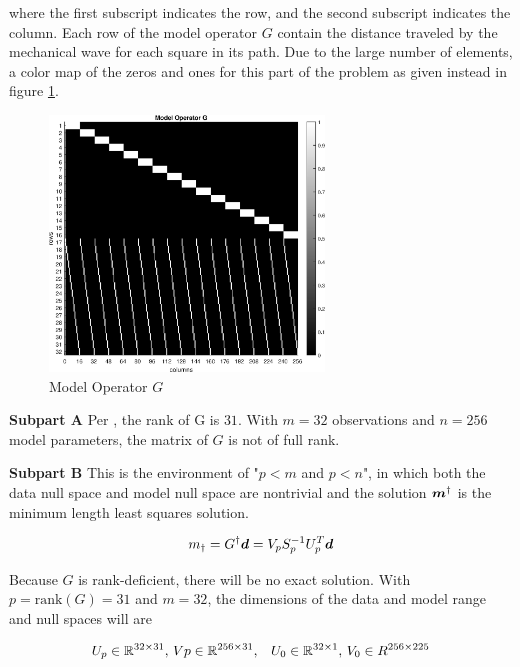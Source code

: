 where the first subscript indicates the row, and the second subscript indicates the column. Each row of the model operator $G$ contain the distance traveled by the mechanical wave for each square in its path. Due to the large number of elements, a color map of the zeros and ones for this part of the problem as given instead in figure \ref{fig: prob2 part A model operator G}.

\begin{figure}[h] 
	\centering
	\includegraphics[width=0.65\textwidth]{./images/prob2_partA_model_operator_G.eps}
	\caption{Model Operator $G$}
	\label{fig: prob2 part A model operator G}
\end{figure}
\FloatBarrier

\textbf{Subpart A} \newline
Per \MATLAB, the rank of G is $31$. With $m = 32$ observations and $n = 256$ model parameters, the matrix of $G$ is not of full rank.
\newline

\textbf{Subpart B} \newline
This is the environment of "$p < m$ and $p < n$", in which both the data null space and model null space are nontrivial and the solution $\boldsymbol{m}^\dagger$ is the minimum length least squares solution. 

\begin{align*}
	m_{\dagger} = G^\dagger \boldsymbol{d} = V_p S_p^{-1} U_p^T \boldsymbol{d}
\end{align*}

Because $G$ is rank-deficient, there will be no exact solution. With $p = \textrm{rank}\left(G\right) = 31$ and $m = 32$, the dimensions of the data and model range and null spaces will are

\begin{align*}
	U_p \in \mathbb{R}^{32 \times 31},\, Vp \in \mathbb{R}^{256 \times 31}, \,\,\,\,\, U_0 \in \mathbb{R}^{32 \times 1}, \, V_0 \in R^{256 \times 225}
\end{align*}

